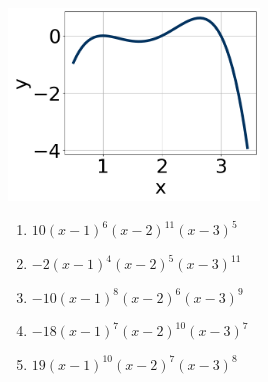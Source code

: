 \documentclass[14pt]{extbook}
\begin{document}
\begin{enumerate}
{\begin{center}
    \includegraphics[width=0.5\textwidth]{../Figures/polyGraphToFunctionCopyC.png}
\end{center}
\begin{enumerate}[label=\Alph*.]
\item \( 10(x - 1)^{6} (x - 2)^{11} (x - 3)^{5} \)
\item \( -2(x - 1)^{4} (x - 2)^{5} (x - 3)^{11} \)
\item \( -10(x - 1)^{8} (x - 2)^{6} (x - 3)^{9} \)
\item \( -18(x - 1)^{7} (x - 2)^{10} (x - 3)^{7} \)
\item \( 19(x - 1)^{10} (x - 2)^{7} (x - 3)^{8} \)


\end{enumerate}}
\end{enumerate}
\end{document}
